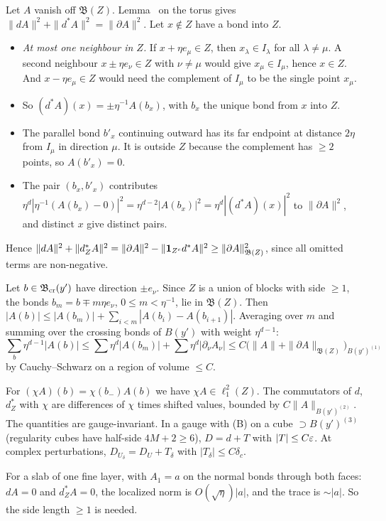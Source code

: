 \begin{detail}\label{d9:trace}
\begin{step}[The identity at $U=1$]
Let $A$ vanish off $\mathfrak B(Z)$. Lemma~ on the torus gives $\|dA\|^2+\|d^*A\|^2=\|\partial A\|^2$. Let $x\notin Z$ have a bond into $Z$.
\begin{itemize}
\item \emph{At most one neighbour in $Z$.} If $x+\eta e_\mu\in Z$, then $x_\lambda\in I_\lambda$ for all $\lambda\ne\mu$. A second neighbour $x\pm\eta e_\nu\in Z$ with $\nu\ne\mu$ would give $x_\mu\in I_\mu$, hence $x\in Z$. And $x-\eta e_\mu\in Z$ would need the complement of $I_\mu$ to be the single point $x_\mu$.
\item So $(d^*A)(x)=\pm\eta^{-1}A(b_x)$, with $b_x$ the unique bond from $x$ into $Z$.
\item The parallel bond $b'_x$ continuing outward has its far endpoint at distance $2\eta$ from $I_\mu$ in direction $\mu$. It is outside $Z$ because the complement has $\ge2$ points, so $A(b'_x)=0$.
\item The pair $(b_x,b'_x)$ contributes $\eta^d|\eta^{-1}(A(b_x)-0)|^2=\eta^{d-2}|A(b_x)|^2=\eta^d|(d^*A)(x)|^2$ to $\|\partial A\|^2$, and distinct $x$ give distinct pairs.
\end{itemize}
Hence $\|dA\|^2+\|d^*_ZA\|^2=\|\partial A\|^2-\|\mathbf 1_{Z^c}d^*A\|^2\ge\|\partial A\|^2_{\mathfrak B(Z)}$, since all omitted terms are non-negative.
\end{step}
\begin{step}
Let $b\in\mathfrak B_{\rm cr}(y')$ have direction $\pm e_\nu$. Since $Z$ is a union of blocks with side $\ge1$, the bonds $b_m=b\mp m\eta e_\nu$, $0\le m<\eta^{-1}$, lie in $\mathfrak B(Z)$. Then $|A(b)|\le|A(b_m)|+\sum_{i<m}|A(b_i)-A(b_{i+1})|$. Averaging over $m$ and summing over the crossing bonds of $B(y')$ with weight $\eta^{d-1}$:
\[
\sum_b\eta^{d-1}|A(b)|\le\sum\eta^d|A(b_m)|+\sum\eta^d|\partial_\nu A_\nu|\le C\big(\|A\|+\|\partial A\|_{\mathfrak B(Z)}\big)_{B(y')^{(1)}}
\]
by Cauchy--Schwarz on a region of volume $\le C$.
\end{step}
\begin{step}
For $(\chi A)(b)=\chi(b_-)A(b)$ we have $\chi A\in\ell^2_1(Z)$. The commutators of $d$, $d^*_Z$ with $\chi$ are differences of $\chi$ times shifted values, bounded by $C\|A\|_{B(y')^{(2)}}$. The quantities are gauge-invariant. In a gauge with (B) on a cube $\supset B(y')^{(3)}$ (regularity cubes have half-side $4M+2\ge6$), $D=d+T$ with $|T|\le C\varepsilon$. At complex perturbations, $D_{U_\delta}=D_U+T_\delta$ with $|T_\delta|\le C\delta_c$.
\end{step}
\begin{step}
For a slab of one fine layer, with $A_1=a$ on the normal bonds through both faces: $dA=0$ and $d^*_ZA=0$, the localized norm is $O(\sqrt\eta)|a|$, and the trace is $\sim|a|$. So the side length $\ge1$ is needed.
\end{step}
\end{detail}

